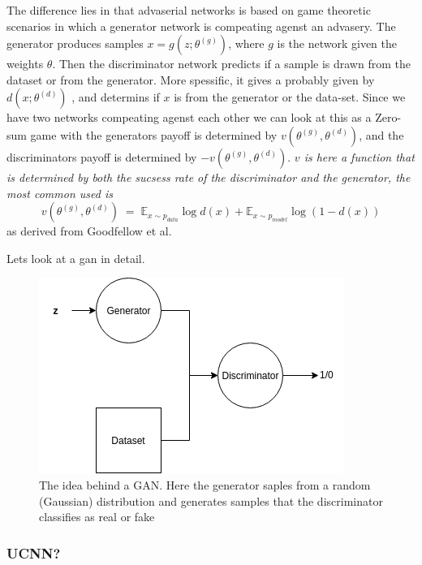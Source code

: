 	  The difference lies in that advaserial networks is based on game theoretic scenarios in which a generator network is compeating agenst an advasery. 
	  The generator produces samples $x=g(z;\theta^{(g)})$, where $g$ is the network given the weights $\theta$. Then the discriminator network predicts if a sample is drawn from the dataset or from the generator.
	  More spessific, it gives a probably given by $d(x;\theta^{(d)})$ , and determins if $x$ is from the generator or the data-set. 
	  Since we have two networks compeating agenst each other we can look at this as a Zero-sum game with the generators payoff is determined by $v(\theta^{(g)},\theta^{(d)})$, and the discriminators payoff is determined 
	  by $-v(\theta^{(g)},\theta^{(d)})$.
	  \textit{$v$ is here a function that is determined by both the sucsess rate of the discriminator and the generator, the most common used is}
	  \begin{equation}
	  v(\theta^{(g)},\theta^{(d)}) \; = \; \mathds{E}_{x\sim p_{data}}\log{d(x)} + \mathds{E}_{x\sim p_{model}}\log{(1 - d(x))} %
	  \end{equation}
	  as derived from Goodfellow et al. %
	  
	  Lets look at a gan in detail. \\
	  \begin{figure}[ht!]
	    \centering
	    \includegraphics[scale=0.5]{background/figures/simpleGAN.png}
	    \caption{The idea behind a GAN. Here the generator saples from a random (Gaussian) distribution and generates samples that the discriminator classifies as real or fake}
	\end{figure}
	
    \subsubsection{UCNN?}	
	
